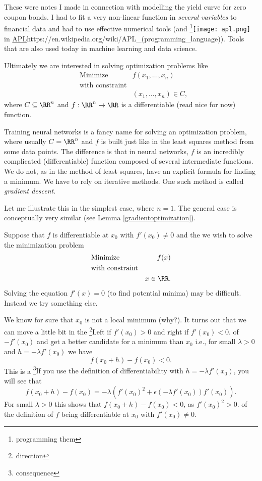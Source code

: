 \documentclass{article}
\begin{document}
These were notes I made in connection with modelling the yield curve
for zero coupon bonds.  I had to fit a very non-linear function in
\emph{several variables} to financial data and had to use effective
numerical tools (and \footnote{programming them}{\texttt{[image: apl.png]}} in 
\url{APL}{https://en.wikipedia.org/wiki/APL_(programming_language)}). Tools
that are also used today in machine learning and data science.

Ultimately we are interested in solving optimization problems like
  \begin{align*}
    &\text{Minimize} &f(x_1, \dots, x_n)\\
    &\text{with constraint}\\
    &&(x_1, \dots, x_n)\in C,
  \end{align*}
  where $C\subseteq \RR^n$ and $f:\RR^n\rightarrow \RR$ is a differentiable (read nice for now) function.

  Training neural networks is a fancy name for solving an optimization problem, where
  usually $C = \RR^n$ and $f$ is built just like in the least squares method from some
  data points. The difference is that in neural networks, $f$ is an incredibly complicated
  (differentiable) function composed of several intermediate functions. We do not, as in the method of
  least squares, have an explicit formula for finding a minimum. We have to
  rely on iterative methods. One such method is called \emph{gradient descent}.

  Let me illustrate this in the simplest case, where $n=1$. The general case is conceptually very similar
  (see Lemma \ref{gradientoptimization}).

  Suppose that
  $f$ is differentiable at $x_0$ with $f'(x_0)\neq 0$ and the we wish to
  solve the minimization problem
  \begin{align*}
    &\text{Minimize} &f(x)\\
    &\text{with constraint}\\
    &&x\in \RR.
  \end{align*}
  Solving the equation $f'(x) = 0$ (to find potential minima) may
  be difficult. Instead we try something else.
  
  We know for sure that $x_0$ is not a local minimum (why?). It turns out that we can
  move a little bit in the \footnote{direction}{Left if $f'(x_0) > 0$ and right if $f'(x_0) < 0$.} of $-f'(x_0)$  and get a better candidate for
  a minimum than $x_0$ i.e., for small $\lambda > 0$ and $h = -\lambda f'(x_0)$ we have
  $$
  f(x_0 + h) - f(x_0) < 0. 
  $$
  This is a \footnote{consequence}{If you use the definition of differentiability with $h = -\lambda f'(x_0)$, you will see that
    $$f(x_0 + h) - f(x_0) = - \lambda( f'(x_0)^2 + \epsilon(-\lambda f'(x_0)) f'(x_0)).$$ For small $\lambda > 0$ this shows that $f(x_0 + h) - f(x_0) < 0$, as $f'(x_0)^2 > 0$.} of the definition of $f$ being differentiable at $x_0$ with
  $f'(x_0)\neq 0$.
\end{document}
